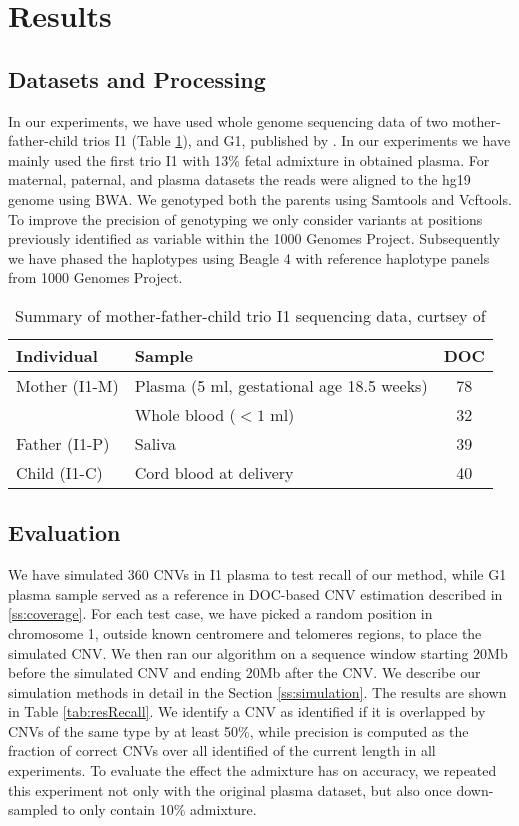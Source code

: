 \section{Results}

\subsection{Datasets and Processing}
\label{data}
In our experiments, we have used whole genome sequencing data of two mother-father-child trios I1 (Table \ref{tab:I1}), and G1, published by \cite{kitzman2012}. In our experiments we have mainly used the first trio I1 with 13\% fetal admixture in obtained plasma. For maternal, paternal, and plasma datasets the reads were aligned to the hg19 genome using BWA. We genotyped both the parents using Samtools and Vcftools. To improve the precision of genotyping we only consider variants at positions previously identified as variable within the 1000 Genomes Project.  Subsequently we have phased the haplotypes using Beagle 4 \cite{browning2013} with reference haplotype panels from 1000 Genomes Project. 
\begin{table}[t]
\centering
\begin{tabular}{l|l|c}
Individual & Sample & DOC \\ \hline
Mother (I1-M) & Plasma (5 ml, gestational age 18.5 weeks) & 78 \\
	& Whole blood ($<1$ ml) & 32 \\
Father (I1-P) & Saliva & 39 \\
Child (I1-C) & Cord blood at delivery & 40
\end{tabular}
\vspace{3pt}
\caption{Summary of mother-father-child trio I1 sequencing data, curtsey of \cite{kitzman2012}  }
\label{tab:I1} 
\end{table}

\subsection{Evaluation}
We have simulated 360 CNVs in I1 plasma to test recall of our method, while G1 plasma sample served as a reference in DOC-based CNV estimation described in \ref{ss:coverage}. For each test case, we have picked a random position in chromosome 1, outside known centromere and telomeres regions, to place the simulated CNV.  We then ran our algorithm on a sequence window starting 20Mb before the simulated CNV and ending 20Mb after the CNV.  We describe our simulation methods in detail in the Section \ref{ss:simulation}. The results are shown in Table \ref{tab:resRecall}. We identify a CNV as identified if it is overlapped by CNVs of the same type by at least 50\%, while precision is computed as the fraction of correct CNVs over all identified of the current length in all experiments. To evaluate the effect the admixture has on accuracy, we repeated this experiment not only with the original plasma dataset, but also once down-sampled to only contain 10\% admixture. 

